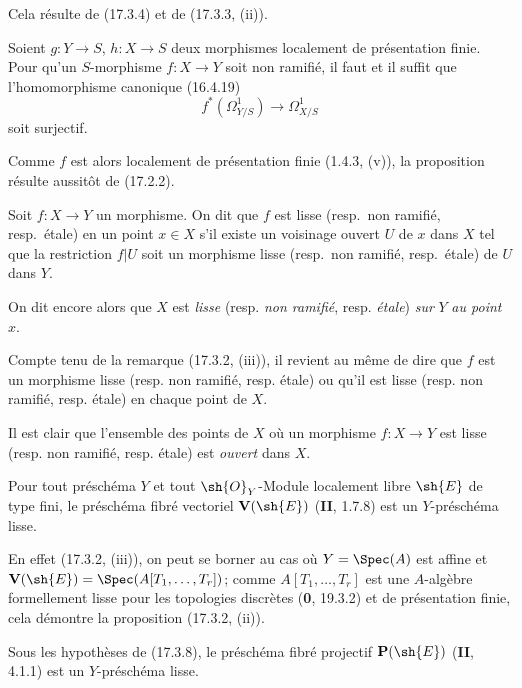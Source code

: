 Cela résulte de (17.3.4) et de (17.3.3, (ii)).

\begin{proposition}[17.3.6]
\label{IV.17.3.6}
Soient $g:Y\to S$, $h:X\to S$ deux morphismes localement de présentation finie. Pour qu'un $S$-morphisme $f:X\to Y$ soit non ramifié, il faut et il suffit que l'homomorphisme canonique \textup{(16.4.19)}
\[
  f^*(\varOmega_{Y/S}^1)\longrightarrow\varOmega_{X/S}^1
\]
soit surjectif.
\end{proposition}

Comme $f$ est alors localement de présentation finie (1.4.3, (v)), la proposition résulte aussitôt de (17.2.2).

\begin{definition}[17.3.7]
Soit $f:X\to Y$ un morphisme. On dit que $f$ est lisse \textup{(resp.}\ non ramifié, \textup{resp.}\ étale\textup{)} en un point $x\in X$ s'il existe un voisinage ouvert $U$ de $x$ dans $X$ tel que la restriction $f|U$ soit un morphisme lisse \textup{(resp.}\ non ramifié, \textup{resp.}\ étale\textup{)} de $U$ dans $Y$.
\end{definition}

On dit encore alors que $X$ est \emph{lisse} (resp. \emph{non ramifié}, resp. \emph{étale}) \emph{sur} $Y$ \emph{au point} $x$.

Compte tenu de la remarque (17.3.2, (iii)), il revient au même de dire que $f$ est un morphisme lisse (resp. non ramifié, resp. étale) ou qu'il est lisse (resp. non ramifié, resp. étale) en chaque point de $X$.

Il est clair que l'ensemble des points de $X$ où un morphisme $f:X\to Y$ est lisse (resp. non ramifié, resp. étale) est \emph{ouvert} dans $X$.

\begin{proposition}[17.3.8]
\label{IV.17.3.8}
Pour tout préschéma $Y$ et tout $\sh{O}_Y$-Module localement libre $\sh{E}$ de type fini, le préschéma fibré vectoriel $\mathbf{V}(\sh{E})$ \textup{(\textbf{II}, 1.7.8)} est un $Y$-préschéma lisse.
\end{proposition}

En effet (17.3.2, (iii)), on peut se borner au cas où $Y=\Spec(A)$ est affine et $\mathbf{V}(\sh{E})=\Spec(A[T_1,\ldots,T_r])$; comme $A[T_1,\ldots,T_r]$ est une $A$-algèbre formellement lisse pour les topologies discrètes (\textbf{0}, 19.3.2) et de présentation finie, cela démontre la proposition (17.3.2, (ii)).

\begin{corollary}[17.3.9]
\label{IV.17.3.9}
Sous les hypothèses de \textup{(17.3.8)}, le préschéma fibré projectif $\mathbf{P}(\sh{E})$ \textup{(\textbf{II}, 4.1.1)} est un $Y$-préschéma lisse.
\end{corollary}

